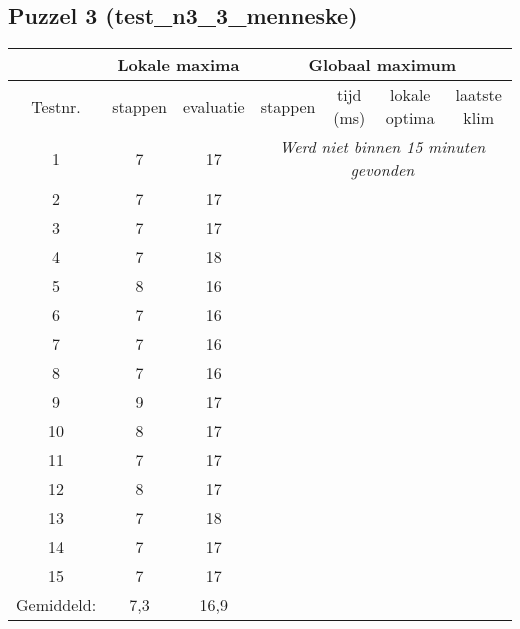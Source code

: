 \documentclass[]{report}
\begin{document}
\begin{appendices}
\subsection{Puzzel 3 (test\_n3\_3\_menneske)}
\begin{tabular}{|c||c|c||c|c|c|c|}
\hline  & \multicolumn{2}{|c||}{Lokale maxima} & \multicolumn{4}{|c|}{Globaal maximum}  \\ 
\hline Testnr. & stappen & evaluatie & stappen & tijd (ms) & lokale optima & laatste klim \\ 
\hline \hline	1	&	7	&	17	&	\multicolumn{4}{|c|}{\textit{Werd niet binnen 15 minuten gevonden}}	\\
\hline	2	&	7	&	17	&		&		&		&	\\
\hline	3	&	7	&	17	&		&		&		&	\\
\hline	4	&	7	&	18	&		&		&		&	\\
\hline	5	&	8	&	16	&		&		&		&	\\
\hline	6	&	7	&	16	&		&		&		&	\\
\hline	7	&	7	&	16	&		&		&		&	\\
\hline	8	&	7	&	16	&		&		&		&	\\
\hline	9	&	9	&	17	&		&		&		&	\\
\hline	10	&	8	&	17	&		&		&		&	\\
\hline	11	&	7	&	17	&		&		&		&	\\
\hline	12	&	8	&	17	&		&		&		&	\\
\hline	13	&	7	&	18	&		&		&		&	\\
\hline	14	&	7	&	17	&		&		&		&	\\
\hline	15	&	7	&	17	&		&		&		&	\\

\hline \hline Gemiddeld: & 7,3 & 16,9 &  &  &  &  \\ 
\hline 
\end{tabular}

\end{appendices}
\end{document}
